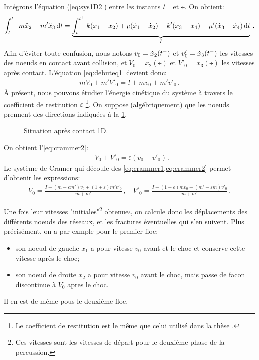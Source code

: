 \noindent Intégrons l'équation (\ref{eq:sys1D2}) entre les instants $t^{-}$ et $\tplus$. On obtient:
\begin{align}    \label{eq:debuteq1}
    \int_{\tmoins}^{\tplus} m\ddot x_2 + m'\ddot x_3 \diff t = \underbrace{\int_{\tmoins}^{\tplus} k(x_1 - x_2) + \mu (\dot x_1 - \dot x_2) - k'(x_3 - x_4) - \mu'(\dot x_3 - \dot x_4) \diff t}_{I} \,.
\end{align}
Afin d'éviter toute confusion, nous notons $v_0 = \dot{x}_2(t^{-})$ et $v'_0 = \dot{x}_3(t^{-})$ les vitesses des noeuds en contact avant collision, et $V_0 = \dot{x}_2(\tplus)$ et $V'_0 = \dot{x}_3(\tplus)$ les vitesses après contact. L'équation \cref{eq:debuteq1} devient donc:
\begin{align} \label{eq:crammer1}
    mV_0 + m'V'_0 = I + mv_0 + m'v'_0 \,.
\end{align}
À présent, nous pouvons étudier l'énergie cinétique du système à travers le coefficient de restitution $\varepsilon$ \footnote{Le coefficient de restitution est le même que celui utilisé dans la thèse \parencite{rabatel2015thesis}.}. On suppose (algébriquement) que les noeuds prennent des directions indiquées à la \cref{fig:contact1dapres}. 
\begin{figure}[!h]
    \centering
    \caption{Situation après contact 1D.}
    \label{fig:contact1dapres}
\end{figure}

\noindent On obtient l'\cref{eq:crammer2}:
\begin{align} \label{eq:crammer2}
    - V_0 + V'_0 = \varepsilon (v_0 - v'_0) \,.
\end{align}
Le système de Cramer qui découle des \cref{eq:crammer1,eq:crammer2} permet d'obtenir les expressions:
\begin{align} \label{eq:vitessesapres1D}
    V_0 = \frac{I + (m-\varepsilon m')v_0 + (1+\varepsilon)m'v'_0}{m+m'} \,, \quad V'_0 = \frac{I + (1+\varepsilon)mv_0 + (m'-\varepsilon m)v'_0}{m+m'}\,.
\end{align}


Une fois leur vitesses "initiales"\footnote{Ces vitesses sont les vitesses de départ pour le deuxième phase de la percussion.} obtenues, on calcule donc les déplacements des différents noeuds des réseaux, et les fractures éventuelles qui s'en suivent. Plus précisément, on a par exmple pour le premier floe:
\begin{itemize}
    \item son noeud de gauche $x_1$ a pour vitesse $v_0$ avant et le choc et conserve cette vitesse après le choc;
    \item son noeud de droite $x_2$ a pour vitesse $v_0$ avant le choc, mais passe de facon discontinue à $V_0$ apres le choc.
\end{itemize}
Il en est de même pous le deuxième floe.

